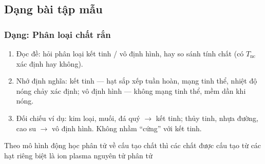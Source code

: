 

\subsection{Dạng bài tập mẫu}
\subsubsection{Dạng: Phân loại chất rắn}


\begin{phuongphap}
\begin{enumerate}
\item Đọc đề: hỏi phân loại kết tinh / vô định hình, hay so sánh tính chất (có $T_{\mathrm{nc}}$ xác định hay không).
\item Nhớ định nghĩa: kết tinh — hạt sắp xếp tuần hoàn, mạng tinh thể, nhiệt độ nóng chảy xác định; vô định hình — không mạng tinh thể, mềm dần khi nóng.
\item Đối chiếu ví dụ: kim loại, muối, đá quý $\to$ kết tinh; thủy tinh, nhựa đường, cao su $\to$ vô định hình. Không nhầm ``cứng'' với kết tinh.
\end{enumerate}
\end{phuongphap}
\begin{vidumau}
	Theo mô hình động học phân tử về cấu tạo chất thì các chất được cấu tạo từ các hạt riêng biệt là
	\choice
	{ion}
	{plasma}
	{nguyên tử}
	{\True phân tử}
\end{vidumau}

